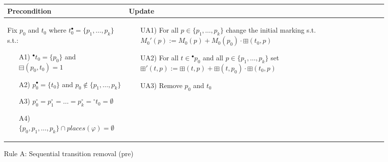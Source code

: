 \begin{figure}[h]
    \begin{adjustbox}{center}
        \begin{tabular}{|p{70mm}|p{62mm}|} \hline
        Precondition & Update \\ \hline
        Fix $p_0$ and $t_0$ where $t_0^\bullet=\{p_1,\dotsc,p_k\}$ s.t.:
        \begin{itemize}[leftmargin=10mm]
            \item[A1)] ${}^\bullet t_0=\{p_0\}$ and $\boxminus(p_0, t_0)=1$
            \item[A2)] $p_0^\bullet=\{t_0\}$ and $p_0\notin\{p_1,\dotsc,p_k\}$
            \item[A3)] $p_0^\circ=p_1^\circ=\dots=p_k^\circ={}^\circ t_0=\emptyset$
            \item[A4)] $\{p_0, p_1,\dotsc,p_k\}\cap places(\varphi)=\emptyset$
        \end{itemize} &
        \begin{itemize}[leftmargin=10mm]
            \item[UA1)] For all $p\in\{p_1,\dotsc,p_k\}$ change the initial marking s.t.\ $M_0'(p):=M_0(p)+M_0(p_0)\cdot\boxplus(t_0, p)$
            \item[UA2)] For all $t\in{}^\bullet p_0$ and all $p\in\{p_1,\dotsc,p_k\}$ set $\boxplus'(t,p):=\boxplus(t,p)+\boxplus(t,p_0)\cdot\boxplus(t_0,p)$
            \item[UA3)] Remove $p_0$ and $t_0$
        \end{itemize} \\ \hline
        \end{tabular}
    \end{adjustbox}
    \caption{Rule A: Sequential transition removal (pre)}
    \label{fig:rule_a_pre}
\end{figure}

